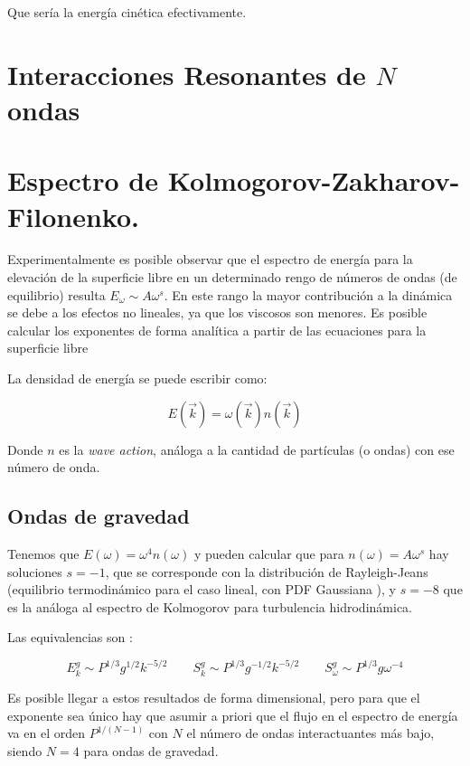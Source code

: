 Que sería la energía cinética efectivamente.


\section{Interacciones Resonantes de $N$ ondas} %

\section{Espectro de Kolmogorov-Zakharov-Filonenko.}
Experimentalmente es posible observar que el espectro de energía para la elevación de la superficie libre en un determinado rengo de números de ondas (de equilibrio) resulta $E_\omega  \sim A\omega^s$. En este rango la mayor contribución a la dinámica se debe a los efectos no lineales, ya que los viscosos son menores. Es posible calcular los exponentes de forma analítica a partir de las ecuaciones para la superficie libre \cite{zakharovEnergySpectrumStochastic1967}

La densidad de energía se puede escribir como:

\begin{equation}
	E(\vec k) = \omega(\vec k) n(\vec k)
\end{equation}  

Donde $n$ es la \textit{wave action}, análoga a la cantidad de partículas (o ondas) con ese número de onda.

\subsection*{Ondas de gravedad \cite{zakharovEnergySpectrumStochastic1967}}
Tenemos que $E(\omega)=\omega^4n(\omega)$ y pueden calcular que para $n(\omega)=A\omega^s$ hay soluciones $s=-1$, que se corresponde con la distribución de Rayleigh-Jeans (equilibrio termodinámico para el caso lineal, con PDF Gaussiana \cite{nazarenkoWaveTurbulence2011}), y $s=-8$ que es la análoga al espectro de Kolmogorov para turbulencia hidrodinámica.

Las equivalencias son \cite{falconExperimentsSurfaceGravity2022}:

\begin{equation}
	E_k^g \sim P^{1/3} g^{1/2} k^{-5/2} \qquad S_k^g \sim P^{1/3} g^{-1/2} k^{-5/2} \qquad S_\omega^g  \sim P^{1/3} g \omega^{-4}
\end{equation}  

Es posible llegar a estos resultados de forma dimensional, pero para que el exponente sea único hay que asumir a priori que el flujo en el espectro de energía va en el orden $P^{1/(N-1)}$ con $N$ el número de ondas interactuantes más bajo, siendo $N=4$ para ondas de gravedad.

